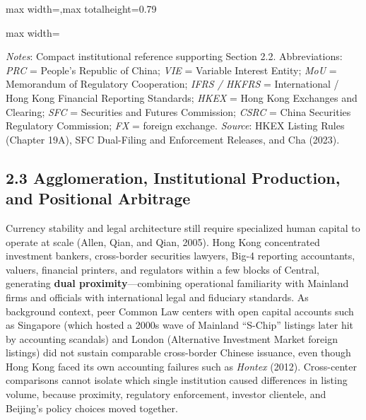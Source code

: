 \documentclass[11pt,letterpaper]{article}
\begin{document}
\begin{table}[!htbp]
\begin{adjustbox}{max width=\textwidth,max totalheight=0.79\textheight}
\begin{minipage}{\textwidth}
\begin{adjustbox}{max width=\textwidth}
\end{adjustbox}
\end{minipage}
\end{adjustbox}
\par\vspace{3pt}\noindent\parbox{\textwidth}{\scriptsize\raggedright \textit{Notes}: Compact institutional reference supporting Section 2.2. Abbreviations: \textit{PRC} = People's Republic of China; \textit{VIE} = Variable Interest Entity; \textit{MoU} = Memorandum of Regulatory Cooperation; \textit{IFRS / HKFRS} = International / Hong Kong Financial Reporting Standards; \textit{HKEX} = Hong Kong Exchanges and Clearing; \textit{SFC} = Securities and Futures Commission; \textit{CSRC} = China Securities Regulatory Commission; \textit{FX} = foreign exchange. \textit{Source}: HKEX Listing Rules (Chapter 19A), SFC Dual-Filing and Enforcement Releases, and Cha (2023).}
\end{table}

\subsection*{\texorpdfstring{2.3 Agglomeration, Institutional Production, and Positional Arbitrage}{2.3 Agglomeration, Institutional Production, and Positional Arbitrage}}
Currency stability and legal architecture still require specialized human capital to operate at scale (Allen, Qian, and Qian, 2005). Hong Kong concentrated investment bankers, cross-border securities lawyers, Big-4 reporting accountants, valuers, financial printers, and regulators within a few blocks of Central, generating \textbf{dual proximity}—combining operational familiarity with Mainland firms and officials with international legal and fiduciary standards. As background context, peer Common Law centers with open capital accounts such as Singapore (which hosted a 2000s wave of Mainland ``S-Chip'' listings later hit by accounting scandals) and London (Alternative Investment Market foreign listings) did not sustain comparable cross-border Chinese issuance, even though Hong Kong faced its own accounting failures such as \textit{Hontex} (2012). Cross-center comparisons cannot isolate which single institution caused differences in listing volume, because proximity, regulatory enforcement, investor clientele, and Beijing's policy choices moved together.
\end{document}
